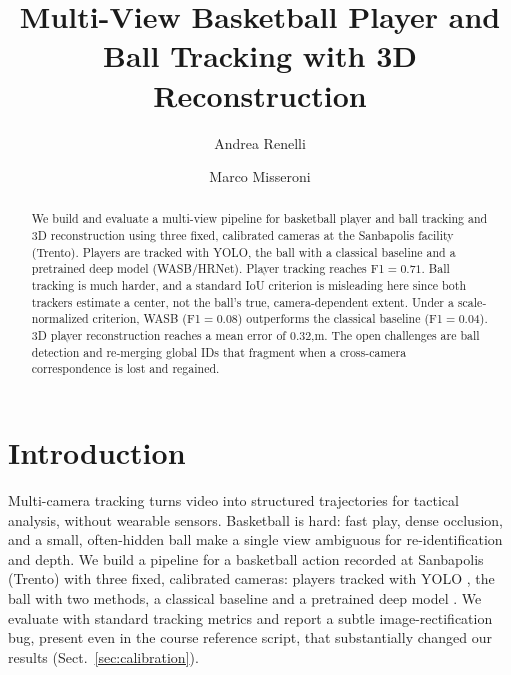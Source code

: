 \documentclass[runningheads]{llncs}
\begin{document}
\title{Multi-View Basketball Player and Ball Tracking with 3D Reconstruction}


\author{Andrea Renelli \and Marco Misseroni}



\maketitle

\begin{abstract}
We build and evaluate a multi-view pipeline for basketball player and ball tracking and 3D reconstruction using three fixed, calibrated cameras at the Sanbapolis facility (Trento). Players are tracked with YOLO, the ball with a classical baseline and a pretrained deep model (WASB/HRNet). Player tracking reaches F1$=0.71$. Ball tracking is much harder, and a standard IoU criterion is misleading here since both trackers estimate a center, not the ball's true, camera-dependent extent. Under a scale-normalized criterion, WASB (F1$=0.08$) outperforms the classical baseline (F1$=0.04$). 3D player reconstruction reaches a mean error of $0.32$,m. The open challenges are ball detection and re-merging global IDs that fragment when a cross-camera correspondence is lost and regained.

\end{abstract}

\section{Introduction}
\label{sec:intro}

Multi-camera tracking turns video into structured trajectories for tactical analysis, without wearable sensors. Basketball is hard: fast play, dense occlusion, and a small, often-hidden ball make a single view ambiguous for re-identification and depth.
We build a pipeline for a basketball action recorded at Sanbapolis (Trento) with three fixed, calibrated cameras: players tracked with YOLO \cite{Jocher2023}, the ball with two methods, a classical baseline and a pretrained deep model \cite{Tarashima2023}. We evaluate with standard tracking metrics \cite{Bernardin2008} and report a subtle image-rectification bug, present even in the course reference script, that substantially changed our results (Sect.~\ref{sec:calibration}).
\end{document}
